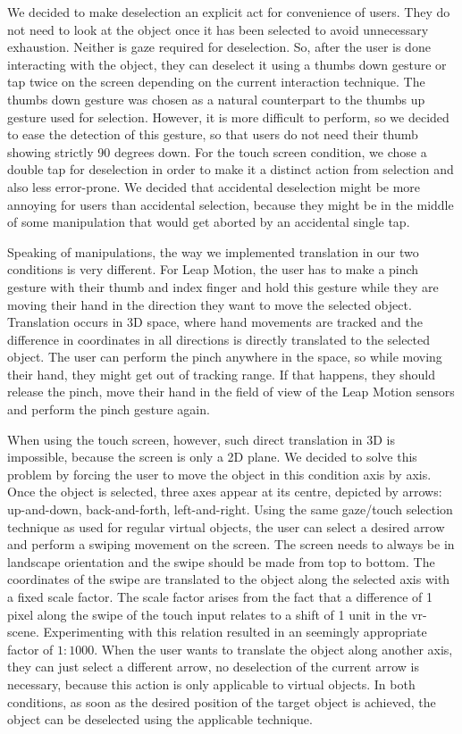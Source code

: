 We decided to make deselection an explicit act for convenience of users. They do not need to look at the object once it has been selected to avoid unnecessary exhaustion. Neither is gaze required for deselection. So, after the user is done interacting with the object, they can deselect it using a thumbs down gesture or tap twice on the screen depending on the current interaction technique. The thumbs down gesture was chosen as a natural counterpart to the thumbs up gesture used for selection. However, it is more difficult to perform, so we decided to ease the detection of this gesture, so that users do not need their thumb showing strictly 90 degrees down. For the touch screen condition, we chose a double tap for deselection in order to make it a distinct action from selection and also less error-prone. We decided that accidental deselection might be more annoying for users than accidental selection, because they might be in the middle of some manipulation that would get aborted by an accidental single tap.

Speaking of manipulations, the way we implemented translation in our two conditions is very different. For Leap Motion, the user has to make a pinch gesture with their thumb and index finger and hold this gesture while they are moving their hand in the direction they want to move the selected object. Translation occurs in 3D space, where hand movements are tracked and the difference in coordinates in all directions is directly translated to the selected object. The user can perform the pinch anywhere in the space, so while moving their hand, they might get out of tracking range. If that happens, they should release the pinch, move their hand in the field of view of the Leap Motion sensors and perform the pinch gesture again. 

When using the touch screen, however, such direct translation in 3D is impossible, because the screen is only a 2D plane. We decided to solve this problem by forcing the user to move the object in this condition axis by axis. Once the object is selected, three axes appear at its centre, depicted by arrows: up-and-down, back-and-forth, left-and-right. Using the same gaze/touch selection technique as used for regular virtual objects, the user can select a desired arrow and perform a swiping movement on the screen. The screen needs to always be in landscape orientation and the swipe should be made from top to bottom.
The coordinates of the swipe are translated to the object along the selected axis with a fixed scale factor.
The scale factor arises from the fact that a difference of 1 pixel along the swipe of the touch input relates to a shift of 1 unit in the vr-scene.
Experimenting with this relation resulted in an seemingly appropriate factor of $1:1000$.
When the user wants to translate the object along another axis, they can just select a different arrow, no deselection of the current arrow is necessary, because this action is only applicable to virtual objects. In both conditions, as soon as the desired position of the target object is achieved, the object can be deselected using the applicable technique.

